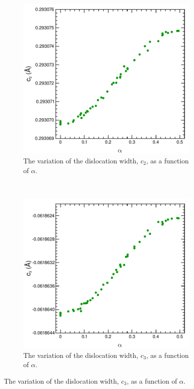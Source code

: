 \begin{figure}
\begin{subfigure}{0.45\textwidth}
\centering
\includegraphics[width=\textwidth]{c2_vs_alpha}
\caption{The variation of the dislocation width, $c_2$, as a function of $\alpha$.\label{fig:c2_vs_alpha}}
\end{subfigure}
~
\begin{subfigure}{0.45\textwidth}
\centering
\includegraphics[width=\textwidth]{c3_vs_alpha}
\caption{The variation of the dislocation width, $c_3$, as a function of $\alpha$.}
\end{subfigure}


\end{figure}
